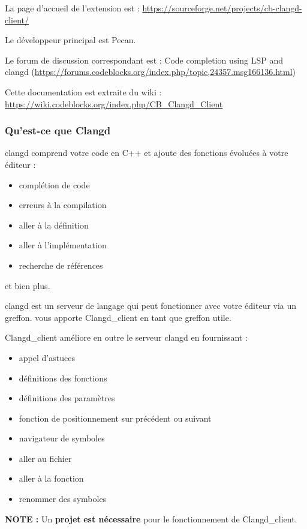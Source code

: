 La page d'accueil de l'extension est : \url{https://sourceforge.net/projects/cb-clangd-client/}

Le développeur principal est Pecan.

Le forum de discussion correspondant est : Code completion using LSP and clangd\newline
(\url{https://forums.codeblocks.org/index.php/topic,24357.msg166136.html})

Cette documentation est extraite du wiki : \url{https://wiki.codeblocks.org/index.php/CB_Clangd_Client}

\subsubsection{Qu'est-ce que Clangd}

clangd comprend votre code en C++ et ajoute des fonctions évoluées à votre éditeur :
\begin{itemize}[noitemsep]
\item complétion de code
\item erreurs à la compilation
\item aller à la définition
\item aller à l'implémentation
\item recherche de références
\end{itemize}
et bien plus.

clangd est un serveur de langage qui peut fonctionner avec votre éditeur via un greffon.\newline
\codeblocks vous apporte Clangd\_client en tant que greffon utile.

Clangd\_client améliore en outre le serveur clangd en fournissant :
\begin{itemize}[noitemsep]
\item appel d'astuces
\item définitions des fonctions
\item définitions des paramètres
\item fonction de positionnement sur précédent ou suivant
\item navigateur de symboles
\item aller au fichier
\item aller à la fonction
\item renommer des symboles
\end{itemize}

\textbf{NOTE :} Un \textbf{projet} \codeblocks \textbf{est nécessaire} pour le fonctionnement de Clangd\_client.

